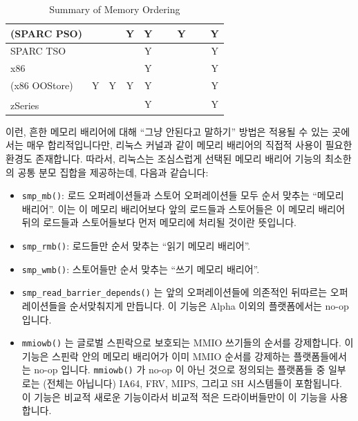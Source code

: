 \begin{table}
\begin{center}
\begin{tabular}{l|c|c|c|c|c|c|c|c}
	\hline
	(SPARC PSO)	& ~ & ~ & Y & Y   & ~ & Y & ~ & Y \\
	\hline
	SPARC TSO	& ~ & ~ & ~ & Y   & ~ & ~ & ~ & Y \\
	\hline
	x86		& ~ & ~ & ~ & Y   & ~ & ~ & ~ & Y \\
	\hline
	(x86 OOStore)	& Y & Y & Y & Y   & ~ & ~ & ~ & Y \\
	\hline
	zSeries\textsuperscript{\textregistered}
			& ~ & ~ & ~ & Y   & ~ & ~ & ~ & Y \\
\end{tabular}
\end{center}
\caption{Summary of Memory Ordering}
\label{tab:app:whymb:Summary of Memory Ordering}
\end{table}

이런, 흔한 메모리 배리어에 대해 ``그냥 안된다고 말하기'' 방법은 적용될 수 있는
곳에서는 매우 합리적입니다만, 리눅스 커널과 같이 메모리 배리어의 직접적 사용이
필요한 환경도 존재합니다.
따라서, 리눅스는 조심스럽게 선택된 메모리 배리어 기능의 최소한의 공통 분모
집합을 제공하는데, 다음과 같습니다:
\begin{itemize}
\item	{\tt smp\_mb()}: 로드 오퍼레이션들과 스토어 오퍼레이션들 모두 순서
	맞추는 ``메모리 배리어''.
	이는 이 메모리 배리어보다 앞의 로드들과 스토어들은 이 메모리 배리어
	뒤의 로드들과 스토어들보다 먼저 메모리에 처리될 것이란 뜻입니다.
\item	{\tt smp\_rmb()}: 로드들만 순서 맞추는 ``읽기 메모리 배리어''.
\item	{\tt smp\_wmb()}: 스토어들만 순서 맞추는 ``쓰기 메모리 배리어''.
\item	{\tt smp\_read\_barrier\_depends()} 는 앞의 오퍼레이션들에 의존적인
	뒤따르는 오퍼레이션들을 순서맞춰지게 만듭니다.
	이 기능은 Alpha 이외의 플랫폼에서는 no-op 입니다.
\item	{\tt mmiowb()} 는 글로벌 스핀락으로 보호되는 MMIO 쓰기들의 순서를
	강제합니다.
	이 기능은 스핀락 안의 메모리 배리어가 이미 MMIO 순서를 강제하는
	플랫폼들에서는 no-op 입니다.
	{\tt mmiowb()} 가 no-op 이 아닌 것으로 정의되는 플랫폼들 중 일부로는
	(전체는 아닙니다) IA64, FRV, MIPS, 그리고 SH 시스템들이 포함됩니다.
	이 기능은 비교적 새로운 기능이라서 비교적 적은 드라이버들만이 이 기능을
	사용합니다.
\end{itemize}
\iffalse

